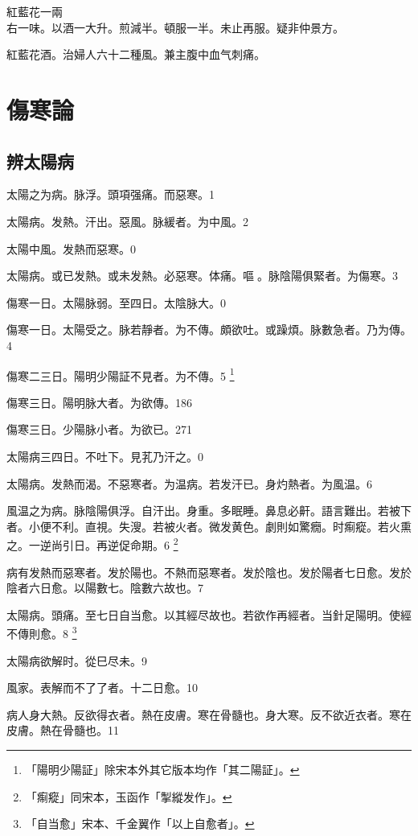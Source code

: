 紅藍花{\scriptsize 一兩}\\
右一味。以酒一大升。煎減半。頓服一半。未止再服。{\scriptsize 疑非仲景方。}{\dengben}

紅藍花酒。治婦人六十二種風。兼主腹中血气刺痛。

\part{傷寒論}

\chapter{辨太陽病}

太陽之为病。{\khaaitp 脉浮。}頭項强痛。而惡寒。1

太陽病。发熱。汗出。惡風。脉緩者。为中風。2

太陽中風。发熱而惡寒。0

太陽病。或已发熱。或未发熱。必惡寒。体痛。嘔{\sungtpii 𠱘}。脉陰陽俱緊者。为傷寒。3

傷寒一日。太陽脉弱。至四日。太陰脉大。0

傷寒一日。太陽受之。脉若靜者。为不傳。頗欲吐。或躁煩。脉數急者。乃为傳。4

傷寒{\khaaitp 二三日}。陽明少陽証不見者。为不傳。5
	\footnote{「陽明少陽証」除宋本外其它版本均作「其二陽証」。}

傷寒三日。陽明脉大{\khaaitp 者。为欲傳}。186

傷寒三日。少陽脉小者。为欲已。271

太陽病三四日。不吐下。見芤乃汗之。0

太陽病。发熱而渴。不惡寒者。为温病。若发汗已。身灼熱者。为風温。6

風温{\khaaitp 之}为病。脉陰陽俱浮。自汗出。身重。多眠睡。鼻息必鼾。語言難出。若被下者。小便不利。直視。失溲。若被火者。微发黄{\khaaitp 色}。劇則如驚癇。时痸瘲。若火熏之。一逆尚引日。再逆促命期。6
	\footnote{「痸瘲」同宋本，玉函作「掣縱发作」。}

病有发熱而惡寒者。发於陽也。不熱而惡寒者。发於陰也。发於陽者七日愈。发於陰者六日愈。以陽數七。陰數六故也。7

太陽病。頭痛。至七日自当愈。以其經尽故也。若欲作再經者。当針足陽明。使經不傳則愈。8
	\footnote{「自当愈」宋本、千金翼作「以上自愈者」。}

太陽病欲解时。從巳尽未。9

風家。表解而不了了者。十二日愈。10

病人身大熱。反欲得衣者。熱在皮膚。寒在骨髓也。身大寒。反不欲近衣者。寒在皮膚。熱在骨髓也。11

